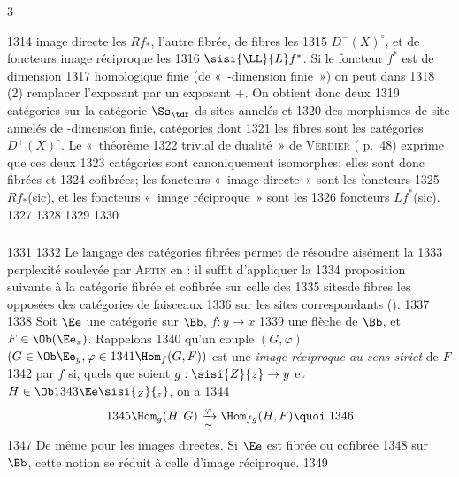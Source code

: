 3	\documentclass[10pt]{../fichiers-configuration-latex/smfart}
\begin{document}
  1314	image directe les $Rf_{\ast}$, l'autre fibrée, de fibres les
  1315	$D^{-}(X)^{\circ}$, et de foncteurs image réciproque les
  1316	$\sisi{\LL}{L} f^{\ast}$. Si le foncteur $f^{\ast}$ est de dimension
  1317	homologique finie (\ie de « \tTor-dimension finie ») on peut dans
  1318	(2) remplacer l'exposant par un exposant $+$. On obtient donc deux
  1319	catégories sur la catégorie $\Ss_{\tdf}$ ds sites annelés et
  1320	des morphismes de site annelés de \tTor-dimension finie, catégories dont
  1321	les fibres sont les catégories $D^{+}(X)^{\circ}$. Le « théorème
  1322	trivial de dualité »  de \textsc{Verdier} (\cite{CD} p.~48) exprime que ces deux
  1323	catégories sont canoniquement isomorphes; elles sont donc fibrées et
  1324	cofibrées; les foncteurs « image directe »  sont les foncteurs
  1325	$Rf_{\ast}$\sisi{}{ }(sic), et les foncteurs « image réciproque »  sont les
  1326	foncteurs $Lf^{\ast}$\sisi{}{ }(sic).
  1327	
  1328	\setcounter{subsection}{1}
  1329	\setcounter{subsubsection}{1}
  1330	\subsubsection{}
  1331	
  1332	Le langage des catégories fibrées permet de résoudre aisément la
  1333	perplexité soulevée par \textsc{Artin} en : il suffit d'appliquer la
  1334	proposition suivante à la catégorie fibrée et cofibrée sur celle des
  1335	sites\pageoriginale de fibres les opposées des catégories de faisceaux
  1336	sur les sites correspondants ().
  1337	
  1338	Soit $\Ee$ une catégorie sur $\Bb$, $f:y\rightarrow x$
  1339	une flèche de $\Bb$, et $F\in \Ob(\Ee_x)$. Rappelons
  1340	qu'un couple $(G,\varphi)$ $(G\in \Ob \Ee_y, \varphi\in
  1341	\Hom_f(G,F))$ est une \emph{image réciproque au sens strict} de $F$
  1342	par $f$ si, quels que soient $g:\sisi{Z}{z}\rightarrow y$ et $H\in \Ob
  1343	\Ee\sisi{_Z}{_z}$, on a
  1344	\[
  1345	\Hom_g(H,G)\xrightarrow[\sim]{\varphi}\Hom_{fg}(H,F){\quoi}.
  1346	\]
  1347	De même pour les images directes. Si $\Ee$ est fibrée ou cofibrée
  1348	sur $\Bb$, cette notion se réduit à celle d'image réciproque.
  1349	
\end{document}
